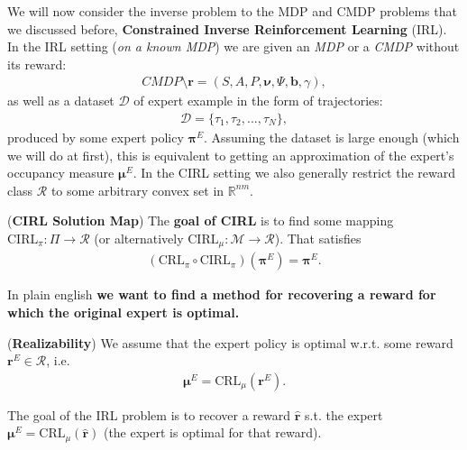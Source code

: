 We will now consider the inverse problem to the MDP and CMDP problems that we discussed before, \textbf{Constrained Inverse Reinforcement Learning} (IRL). In the IRL setting (\textit{on a known MDP}) we are given an \textit{MDP} or a \textit{CMDP} without its reward:
\begin{align*}
    \textit{CMDP} \setminus \bm{r} = (S,A,P,\bm{\nu},\Psi,\bm{b},\gamma),
\end{align*}
as well as a dataset $\mathcal{D}$ of expert example in the form of trajectories:
\begin{align*}
    \mathcal{D} = \{  \tau_1,\tau_2,...,\tau_N\},
\end{align*}
produced by some expert policy $\bm{\pi}^E$. Assuming the dataset is large enough (which we will do at first), this is equivalent to getting an approximation of the expert's occupancy measure $\bm{\mu}^E$. In the CIRL setting we also generally restrict the reward class $\mathcal{R}$ to some arbitrary convex set in $\mathbb{R}^{nm}$. \\
\begin{definition}
    \label{def:CIRL_solmap}
    (\textbf{CIRL Solution Map})
    The \textbf{goal of CIRL} is to find some mapping $\text{CIRL}_\pi : \Pi \rightarrow \mathcal{R}$ (or alternatively $\text{CIRL}_\mu : \mathcal{M} \rightarrow \mathcal{R}$). That satisfies
    \begin{align*}
        (\text{CRL}_\pi \circ \text{CIRL}_\pi)(\bm{\pi}^E) = \bm{\pi}^E.
    \end{align*}
\end{definition}
In plain english \textbf{we want to find a method for recovering a reward for which the original expert is optimal.}

\begin{assumption}
    \label{assumption:realizability}
    (\textbf{Realizability})
    We assume that the expert policy is optimal w.r.t. some reward $\bm{r}^E \in \mathcal{R}$, i.e. 
    \begin{align*}
        \bm{\mu}^E = \text{CRL}_{\mu}(\bm{r}^E).
    \end{align*}
\end{assumption}
\noindent
The goal of the IRL problem is to recover a reward $\hat{\bm{r}}$ s.t. the expert $\bm{\mu}^E = \text{CRL}_{\mu}(\hat{\bm{r}})$ (the expert is optimal for that reward).

